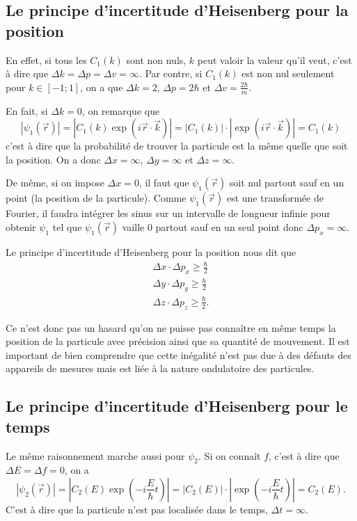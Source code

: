 \subsection{Le principe d'incertitude d'Heisenberg pour la position}
En effet, si tous les $C_1(k)$ sont non nuls,
$k$ peut valoir la valeur qu'il veut,
c'est à dire que
$\Delta k = \Delta p = \Delta v = \infty$.
Par contre, si $C_1(k)$ est non nul seulement
pour $k \in [-1;1]$, on a que
$\Delta k = 2$, $\Delta p = 2\hbar$ et $\Delta v = \frac{2\hbar}{m}$.

En fait, si $\Delta k = 0$, on remarque que
\[ |\psi_1(\vec{r})|
= \left|C_1(k) \exp\left(i\vec{r} \cdot \vec{k}\right)\right|
= \left|C_1(k)\right|\cdot\left|\exp\left(i\vec{r} \cdot \vec{k}\right)\right|
= C_1(k) \]
c'est à dire que la probabilité de trouver la particule est la même
quelle que soit la position.
On a donc $\Delta x = \infty$, $\Delta y = \infty$ et $\Delta z = \infty$.

De même, si on impose $\Delta x = 0$, il faut que $\psi_1(\vec{r})$ soit nul
partout sauf en un point (la position de la particule). Comme $\psi_1(\vec{r})$
est une transformée de Fourier, il faudra intégrer les sinus
sur un intervalle de longueur infinie pour obtenir
$\psi_1$ tel que $\psi_1(\vec{r})$ vaille 0 partout sauf en un seul point
donc $\Delta p_x = \infty$.

Le principe d'incertitude d'Heisenberg pour la position nous dit que
\begin{align*}
  \Delta x \cdot \Delta p_x \geq \frac{\hbar}{2}\\
  \Delta y \cdot \Delta p_y \geq \frac{\hbar}{2}\\
  \Delta z \cdot \Delta p_z \geq \frac{\hbar}{2}.
\end{align*}

Ce n'est donc pas un hasard qu'on ne puisse pas connaître en même temps
la position de la particule avec précision ainsi que sa quantité de mouvement.
Il est important de bien comprendre que cette inégalité n'est pas due
à des défauts des appareils de mesures mais est liée à la nature
ondulatoire des particules.

\subsection{Le principe d'incertitude d'Heisenberg pour le temps}
Le même raisonnement marche aussi pour $\psi_2$.
Si on connaît $f$, c'est à dire
que $\Delta E = \Delta f = 0$, on a
\[ |\psi_2(\vec{r})|
= \left|C_2(E) \exp\left(-i\frac{E}{\hbar}t\right)\right|
= \left|C_2(E)\right|\cdot\left|\exp\left(-i\frac{E}{\hbar}t\right)\right|
= C_2(E). \]
C'est à dire que la particule n'est pas localisée dans le temps, $\Delta t = \infty$.


